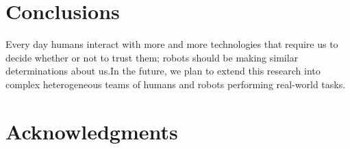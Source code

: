 \documentclass{sig-alternate}
\begin{document}
\section{Conclusions}

Every day humans interact with more and more technologies that require us to decide whether or not to trust them; robots
should be making similar determinations about us.In the future, we plan to extend this research into complex
heterogeneous teams of humans and robots performing real-world tasks.

\section{Acknowledgments}



%

\end{document}
